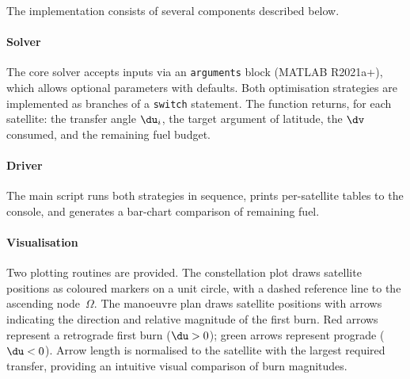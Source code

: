 The implementation consists of several \MATLAB{} components described
below.

\paragraph{Solver}
The core solver accepts inputs via an \texttt{arguments} block
(MATLAB R2021a+), which allows optional parameters with defaults. Both
optimisation strategies are implemented as branches of a \texttt{switch}
statement. The function returns, for each satellite: the transfer angle
$\du_i$, the target argument of latitude, the $\dv$ consumed, and the
remaining fuel budget.

\paragraph{Driver}
The main script runs both strategies in sequence, prints
per-satellite tables to the console, and generates a bar-chart
comparison of remaining fuel.

\paragraph{Visualisation}
Two plotting routines are provided. The constellation plot draws
satellite positions as coloured markers on a unit circle, with a dashed
reference line to the ascending node~$\Omega$. The manoeuvre plan draws
satellite positions with arrows indicating the direction and relative
magnitude of the first burn. Red arrows represent a retrograde first
burn ($\du > 0$); green arrows represent prograde ($\du < 0$). Arrow
length is normalised to the satellite with the largest required transfer,
providing an intuitive visual comparison of burn magnitudes.
